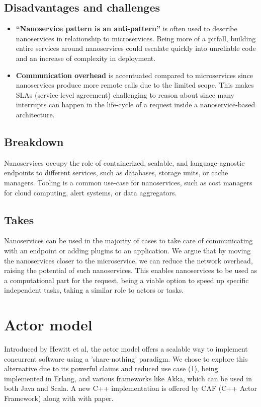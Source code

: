 \subsection*{Disadvantages and challenges}
\begin{itemize}
\item \textbf{“Nanoservice pattern is an anti-pattern”} is often used to describe nanoservices in relationship to microservices. Being more of a pitfall, building entire services around nanoservices could escalate quickly into unreliable code and an increase of complexity in deployment.

\item \textbf{Communication overhead} is accentuated compared to microservices since nanoservices produce more remote calls due to the limited scope. This makes SLAs (service-level agreement) challenging to reason about since many interrupts can happen in the life-cycle of a request inside a nanoservice-based architecture.
\end{itemize}

\subsection*{Breakdown}
Nanoservices occupy the role of containerized, scalable, and language-agnostic endpoints to different services, such as databases, storage units, or cache managers. Tooling is a common use-case for nanoservices, such as cost managers for cloud computing, alert systems, or data aggregators.

\subsection*{Takes}
Nanoservices can be used in the majority of cases to take care of communicating with an endpoint or adding plugins to an application. We argue that by moving the nanoservices closer to the microservice, we can reduce the network overhead, raising the potential of such nanoservices. This enables nanoservices to be used as a computational part for the request, being a viable option to speed up specific independent tasks, taking a similar role to actors or tasks.


\section{Actor model}
Introduced by Hewitt et al, the actor model offers a scalable way to implement concurrent software using a 'share-nothing' paradigm\cite{hewitt}. We chose to explore this alternative due to its powerful claims and reduced use case (1), being implemented in Erlang, and various frameworks like Akka, which can be used in both Java and Scala. A new C++ implementation is offered by CAF (C++ Actor Framework) along with with paper\cite{charousset}.

